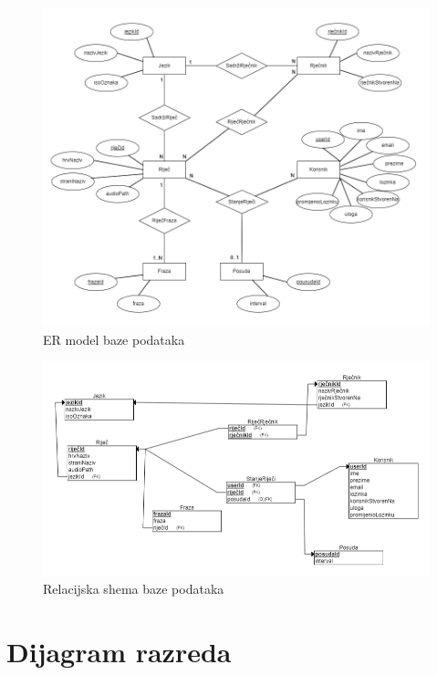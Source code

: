				\begin{figure}[H]
					\includegraphics[scale=0.5]{dijagrami/ER_model_BP_3.png}
					\centering
					\caption{ER model baze podataka}
					\label{fig:dijagram_ER-BP}
				\end{figure}

				\begin{figure}[H]
					\includegraphics[scale=0.5]{dijagrami/relacijski_model.png}
					\centering
					\caption{Relacijska shema baze podataka}
					\label{fig:dijagram_REL-SH_BP}
				\end{figure}
			
			\eject
			
			
		\section{Dijagram razreda}
		
